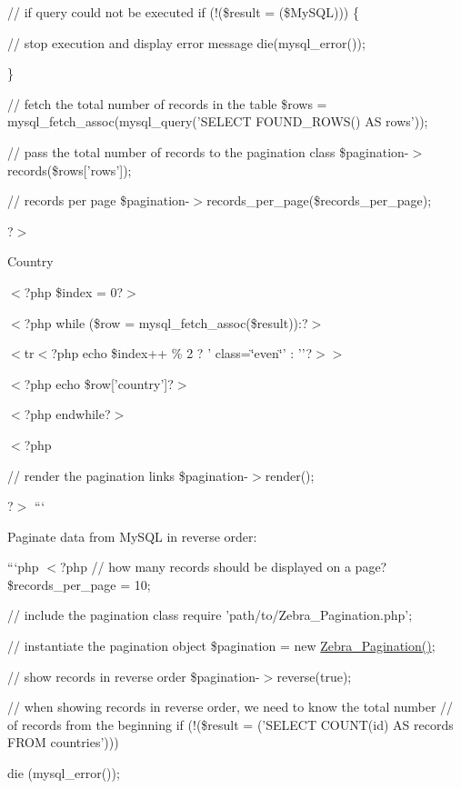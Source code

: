 // if query could not be executed if (!(\$result = (\$\-My\-S\-Q\-L))) \{ \begin{DoxyVerb}// stop execution and display error message
die(mysql_error());
\end{DoxyVerb}


\}

// fetch the total number of records in the table \$rows = mysql\-\_\-fetch\-\_\-assoc(mysql\-\_\-query('S\-E\-L\-E\-C\-T F\-O\-U\-N\-D\-\_\-\-R\-O\-W\-S() A\-S rows'));

// pass the total number of records to the pagination class \$pagination-\/$>$records(\$rows\mbox{[}'rows'\mbox{]});

// records per page \$pagination-\/$>$records\-\_\-per\-\_\-page(\$records\-\_\-per\-\_\-page);

?$>$

\begin{TabularC}{0}
\hline
\end{TabularC}


Country

$<$?php \$index = 0?$>$

$<$?php while (\$row = mysql\-\_\-fetch\-\_\-assoc(\$result))\-:?$>$

$<$tr$<$?php echo \$index++ \% 2 ? ' class=\char`\"{}even\char`\"{}' \-: ''?$>$$>$ 

$<$?php echo \$row\mbox{[}'country'\mbox{]}?$>$ 

$<$?php endwhile?$>$ 

$<$?php

// render the pagination links \$pagination-\/$>$render();

?$>$ ```

Paginate data from My\-S\-Q\-L in reverse order\-:

```php $<$?php // how many records should be displayed on a page? \$records\-\_\-per\-\_\-page = 10;

// include the pagination class require 'path/to/\-Zebra\-\_\-\-Pagination.\-php';

// instantiate the pagination object \$pagination = new \hyperlink{class_zebra___pagination}{Zebra\-\_\-\-Pagination()};

// show records in reverse order \$pagination-\/$>$reverse(true);

// when showing records in reverse order, we need to know the total number // of records from the beginning if (!(\$result = ('S\-E\-L\-E\-C\-T C\-O\-U\-N\-T(id) A\-S records F\-R\-O\-M countries'))) \begin{DoxyVerb}die (mysql_error());
\end{DoxyVerb}


